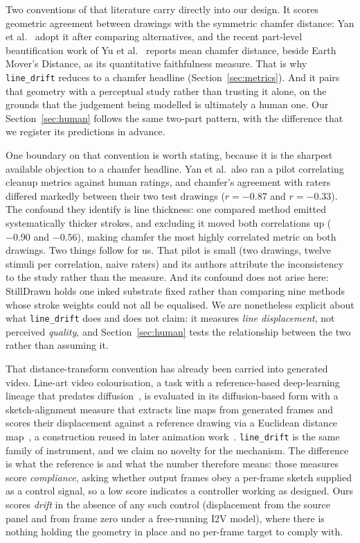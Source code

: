 \documentclass[11pt]{article}
\begin{document}
Two conventions of that literature carry directly into our design. It scores
geometric agreement between drawings with the symmetric chamfer distance:
Yan et al.~\cite{yan2020cleanup} adopt it after comparing alternatives, and the
recent part-level beautification work of Yu et
al.~\cite{yu2024sketchbeaut} reports mean chamfer distance, beside Earth
Mover's Distance, as its quantitative faithfulness measure. That is why \texttt{line\_drift} reduces to a
chamfer headline (Section~\ref{sec:metrics}). And it pairs that geometry with
a perceptual study rather than trusting it alone, on the grounds that the
judgement being modelled is ultimately a human one. Our Section~\ref{sec:human}
follows the same two-part pattern, with the difference that we register its
predictions in advance.

One boundary on that convention is worth stating, because it is the sharpest
available objection to a chamfer headline. Yan et al.\ also ran a pilot
correlating cleanup metrics against human ratings, and chamfer's agreement
with raters differed markedly between their two test drawings ($r=-0.87$ and
$r=-0.33$). The confound they identify is line thickness: one compared method
emitted systematically thicker strokes, and excluding it moved both
correlations up ($-0.90$ and $-0.56$), making chamfer the most highly
correlated metric on both drawings. Two things
follow for us. That pilot is small (two drawings, twelve stimuli per
correlation, naive raters) and its authors attribute the inconsistency to the
study rather than the measure. And its confound does not arise here: StillDrawn
holds one inked substrate fixed rather than comparing nine methods whose
stroke weights could not all be equalised. We are nonetheless explicit about what \texttt{line\_drift}
does and does not claim: it measures \emph{line displacement}, not perceived
\emph{quality}, and Section~\ref{sec:human} tests the relationship between the
two rather than assuming it.

That distance-transform convention has already been carried into generated
video. Line-art video colourisation, a task with a reference-based
deep-learning lineage that predates diffusion~\cite{shi2023linevideo}, is
evaluated in its diffusion-based form with a sketch-alignment
measure that extracts line maps from generated frames and scores their
displacement against a reference drawing via a Euclidean distance
map~\cite{huang2024lvcd}, a construction reused in later animation
work~\cite{li2026sketchkeyanime}. \texttt{line\_drift} is the same family of instrument, and we claim no
novelty for the mechanism. The difference is what the reference is and what
the number therefore means: those measures score \emph{compliance}, asking
whether output frames obey a per-frame sketch supplied as a control signal,
so a low score indicates a controller working as designed. Ours scores
\emph{drift} in the absence of any such control (displacement from the
source panel and from frame zero under a free-running I2V model), where
there is nothing holding the geometry in place and no per-frame target to
comply with.
\end{document}
